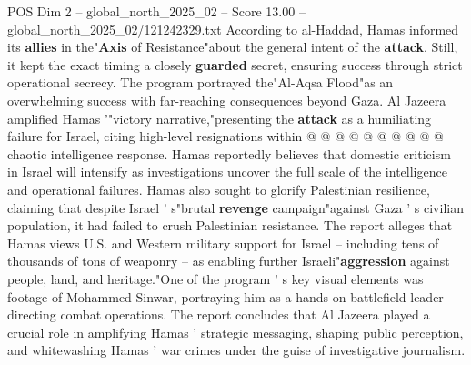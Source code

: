 \begin{textsample}{POS Dim 2 – global\_north\_2025\_02 – Score 13.00 – global\_north\_2025\_02/121242329.txt}
According to al-Haddad, Hamas informed its \textbf{allies} in the"\textbf{Axis} of Resistance"about the general intent of the \textbf{attack}.
Still, it kept the exact timing a closely \textbf{guarded} secret, ensuring success through strict operational secrecy.
The program portrayed the"Al-Aqsa Flood"as an overwhelming success with far-reaching consequences beyond Gaza.
Al Jazeera amplified Hamas '"victory narrative,"presenting the \textbf{attack} as a humiliating failure for Israel, citing high-level resignations within @ @ @ @ @ @ @ @ @ @ chaotic intelligence response.
Hamas reportedly believes that domestic criticism in Israel will intensify as investigations uncover the full scale of the intelligence and operational failures.
Hamas also sought to glorify Palestinian resilience, claiming that despite Israel ' s"brutal \textbf{revenge} campaign"against Gaza ' s civilian population, it had failed to crush Palestinian resistance.
The report alleges that Hamas views U.S. and Western military support for Israel -- including tens of thousands of tons of weaponry -- as enabling further Israeli"\textbf{aggression} against people, land, and heritage."One of the program ' s key visual elements was footage of Mohammed Sinwar, portraying him as a hands-on battlefield leader directing combat operations.
The report concludes that Al Jazeera played a crucial role in amplifying Hamas ' strategic messaging, shaping public perception, and whitewashing Hamas ' war crimes under the guise of investigative journalism.

\end{textsample}
